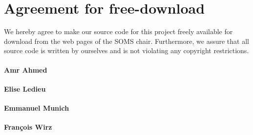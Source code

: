 \documentclass[11pt]{article}
\author{Amr Ahmed, Elise Ledieu, Emmanuel Munich, Fran\c{c}ois Wirz}
\begin{document}

\newpage


\newpage
\section*{Agreement for free-download}
\bigskip


\bigskip


\large We hereby agree to make our source code for this project freely available for download from the web pages of the SOMS chair. Furthermore, we assure that all source code is written by ourselves and is not violating any copyright restrictions.

\begin{center}

\bigskip


\bigskip


\paragraph{Amr Ahmed}

\paragraph{Elise Ledieu}

\paragraph{Emmanuel Munich}

\paragraph{Fran\c{c}ois Wirz}


\end{center}
\newpage







\tableofcontents

\newpage

\end{document}

